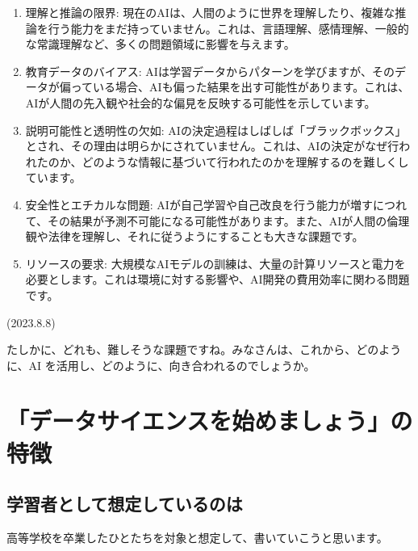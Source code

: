 \documentclass[
  xelatex, ja=standard]{bxjsbook}
\theoremstyle{definition}
\theoremstyle{definition}
\theoremstyle{definition}
\theoremstyle{definition}
\theoremstyle{remark}
\begin{document}
\begin{enumerate}
\def\labelenumi{\arabic{enumi}.}
\item
  理解と推論の限界: 現在のAIは、人間のように世界を理解したり、複雑な推論を行う能力をまだ持っていません。これは、言語理解、感情理解、一般的な常識理解など、多くの問題領域に影響を与えます。
\item
  教育データのバイアス: AIは学習データからパターンを学びますが、そのデータが偏っている場合、AIも偏った結果を出す可能性があります。これは、AIが人間の先入観や社会的な偏見を反映する可能性を示しています。
\item
  説明可能性と透明性の欠如: AIの決定過程はしばしば「ブラックボックス」とされ、その理由は明らかにされていません。これは、AIの決定がなぜ行われたのか、どのような情報に基づいて行われたのかを理解するのを難しくしています。
\item
  安全性とエチカルな問題: AIが自己学習や自己改良を行う能力が増すにつれて、その結果が予測不可能になる可能性があります。また、AIが人間の倫理観や法律を理解し、それに従うようにすることも大きな課題です。
\item
  リソースの要求: 大規模なAIモデルの訓練は、大量の計算リソースと電力を必要とします。これは環境に対する影響や、AI開発の費用効率に関わる問題です。
\end{enumerate}

(2023.8.8)

たしかに、どれも、難しそうな課題ですね。みなさんは、これから、どのように、AI を活用し、どのように、向き合われるのでしょうか。

\hypertarget{ux30c7ux30fcux30bfux30b5ux30a4ux30a8ux30f3ux30b9ux3092ux59cbux3081ux307eux3057ux3087ux3046ux306eux7279ux5fb4}{%
\section{「データサイエンスを始めましょう」の特徴}\label{ux30c7ux30fcux30bfux30b5ux30a4ux30a8ux30f3ux30b9ux3092ux59cbux3081ux307eux3057ux3087ux3046ux306eux7279ux5fb4}}

\hypertarget{ux5b66ux7fd2ux8005ux3068ux3057ux3066ux60f3ux5b9aux3057ux3066ux3044ux308bux306eux306f}{%
\subsection{学習者として想定しているのは}\label{ux5b66ux7fd2ux8005ux3068ux3057ux3066ux60f3ux5b9aux3057ux3066ux3044ux308bux306eux306f}}

高等学校を卒業したひとたちを対象と想定して、書いていこうと思います。
\end{document}
